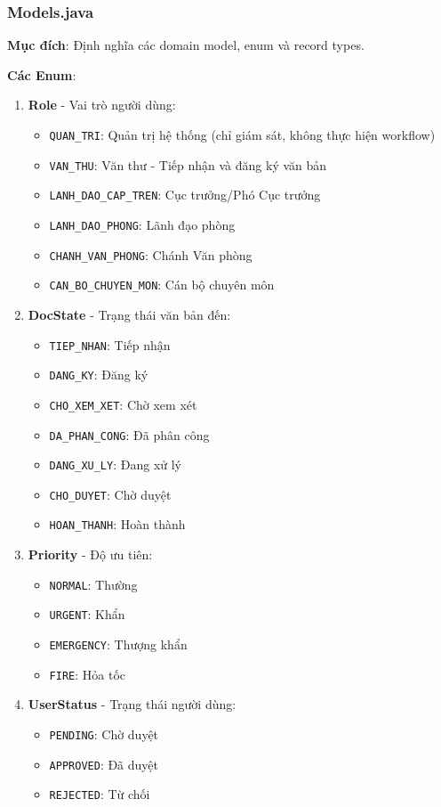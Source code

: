 \documentclass[12pt,a4paper]{article}
\begin{document}
\subsubsection{Models.java}
\textbf{Mục đích}: Định nghĩa các domain model, enum và record types.

\textbf{Các Enum}:

\begin{enumerate}
    \item \textbf{Role} - Vai trò người dùng:
    \begin{itemize}
        \item \texttt{QUAN\_TRI}: Quản trị hệ thống (chỉ giám sát, không thực hiện workflow)
        \item \texttt{VAN\_THU}: Văn thư - Tiếp nhận và đăng ký văn bản
        \item \texttt{LANH\_DAO\_CAP\_TREN}: Cục trưởng/Phó Cục trưởng
        \item \texttt{LANH\_DAO\_PHONG}: Lãnh đạo phòng
        \item \texttt{CHANH\_VAN\_PHONG}: Chánh Văn phòng
        \item \texttt{CAN\_BO\_CHUYEN\_MON}: Cán bộ chuyên môn
    \end{itemize}
    
    \item \textbf{DocState} - Trạng thái văn bản đến:
    \begin{itemize}
        \item \texttt{TIEP\_NHAN}: Tiếp nhận
        \item \texttt{DANG\_KY}: Đăng ký
        \item \texttt{CHO\_XEM\_XET}: Chờ xem xét
        \item \texttt{DA\_PHAN\_CONG}: Đã phân công
        \item \texttt{DANG\_XU\_LY}: Đang xử lý
        \item \texttt{CHO\_DUYET}: Chờ duyệt
        \item \texttt{HOAN\_THANH}: Hoàn thành
    \end{itemize}
    
    \item \textbf{Priority} - Độ ưu tiên:
    \begin{itemize}
        \item \texttt{NORMAL}: Thường
        \item \texttt{URGENT}: Khẩn
        \item \texttt{EMERGENCY}: Thượng khẩn
        \item \texttt{FIRE}: Hỏa tốc
    \end{itemize}
    
    \item \textbf{UserStatus} - Trạng thái người dùng:
    \begin{itemize}
        \item \texttt{PENDING}: Chờ duyệt
        \item \texttt{APPROVED}: Đã duyệt
        \item \texttt{REJECTED}: Từ chối
    \end{itemize}
\end{enumerate}
\end{document}
